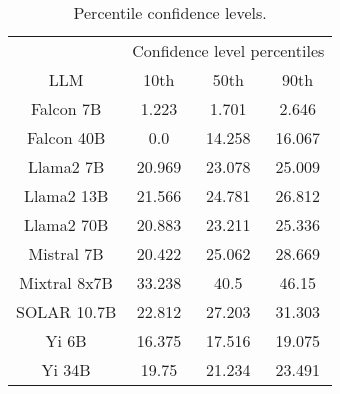 \begin{table*}
\centering
\begin{tabular}{c|c|c|c}
& \multicolumn{3}{c}{Confidence level percentiles} \\ 
LLM & 10th & 50th & 90th\\ \hline
Falcon 7B & 1.223 & 1.701 & 2.646\\
Falcon 40B & 0.0 & 14.258 & 16.067\\
Llama2 7B & 20.969 & 23.078 & 25.009\\
Llama2 13B & 21.566 & 24.781 & 26.812\\
Llama2 70B & 20.883 & 23.211 & 25.336\\
Mistral 7B & 20.422 & 25.062 & 28.669\\
Mixtral 8x7B & 33.238 & 40.5 & 46.15\\
SOLAR 10.7B & 22.812 & 27.203 & 31.303\\
Yi 6B & 16.375 & 17.516 & 19.075\\
Yi 34B & 19.75 & 21.234 & 23.491\\
\hline
\end{tabular}
\caption{Percentile confidence levels.}
\label{tab:percentile_conf}
\end{table*}
